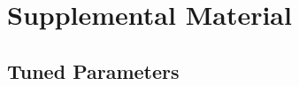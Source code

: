 \documentclass{article}
\renewcommand{\_}[1]{\underline{ #1 }}
\theoremstyle{definition}
\begin{document}
\cleardoublepage
\ifdefined{}
\else
\fi

% 
\nocite{*} %
\printbibliography


\section[sec:supp_mat]{Supplemental Material}
\label{sec:supp_mat}

\subsection[subsec:params]{Tuned Parameters}
\label{subsec:params}
\end{document}
